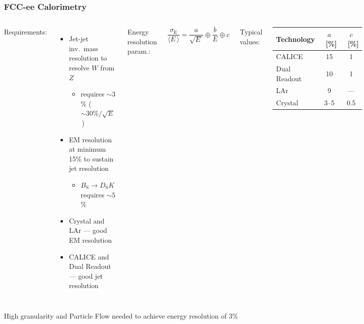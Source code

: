 \documentclass[aspectratio=169]{beamer}
\newcommand{\bluetext}[1]{%
  \textcolor{myBlue}{#1}
}
\newcommand{\redtext}[1]{%
  \textcolor{myRed}{#1}
}
\begin{document}
\begin{frame}
  \frametitle{FCC-ee Calorimetry}

  \vspace{2ex}
  \begin{columns}[c]
    \bluetext{Requirements:}
    \begin{itemize}
      \item Jet-jet inv.\ mass resolution to resolve $W$ from $Z$
            \begin{itemize}
              \item requires $\sim 3$\% ($\sim 30\% / \sqrt{E}$\,)
            \end{itemize}
      \item EM resolution at minimum 15\% to sustain jet resolution\\[-0.4ex]
            \begin{itemize}
              \item $B_\text{S} \rightarrow D_\text{S}K$ requires $\sim 5$\%
            \end{itemize}
      \item Crystal and LAr --- good EM resolution
      \item CALICE and Dual Readout --- good jet resolution
    \end{itemize}

    \bluetext{Energy resolution param.:}
    \[ \frac{\sigma_\text{E}}{\langle E\,\rangle} = \frac{a}{\sqrt{E\,}} \oplus
                                                    \frac{b}{E} \oplus c \]

    \bluetext{Typical values:}
    \begin{center}
      \small
      \begin{tabular}{lcc}
        Technology   & $a$~[\%] & $c$~[\%] \\
        \midrule
        CALICE       & 15       & 1 \\
        Dual Readout & 10       & 1 \\
        LAr          & 9        & --- \\
        Crystal      & 3--5     & 0.5 \\
      \end{tabular}
    \end{center}
  \end{columns}

  \vspace{1ex}
  \redtext{High granularity and Particle Flow needed to achieve energy
           resolution of 3\%}
\end{frame}
\end{document}
